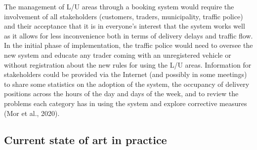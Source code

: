 \documentclass[
]{book}
\begin{document}
The management of L/U areas through a booking system would require the involvement of all stakeholders (customers, traders, municipality, traffic police) and their acceptance that it is in everyone's interest that the system works well as it allows for less inconvenience both in terms of delivery delays and traffic flow. In the initial phase of implementation, the traffic police would need to oversee the new system and educate any trader coming with an unregistered vehicle or without registration about the new rules for using the L/U areas. Information for stakeholders could be provided via the Internet (and possibly in some meetings) to share some statistics on the adoption of the system, the occupancy of delivery positions across the hours of the day and days of the week, and to review the problems each category has in using the system and explore corrective measures (Mor et al., 2020).

\hypertarget{current-state-of-art-in-practice-32}{%
\subsection*{Current state of art in practice}\label{current-state-of-art-in-practice-32}}
\end{document}
